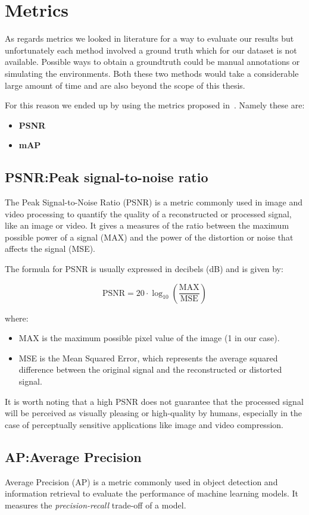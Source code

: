 \section{Metrics}\label{sec:Metrics}
As regards metrics we looked in literature for a way to evaluate
our results but unfortunately each method involved a ground truth
which for our dataset is not available. Possible ways to obtain
a groundtruth could be manual annotations or simulating the environments.
Both these two methods would take a considerable large amount
of time and are also beyond the scope of this thesis.

For this reason we ended up by using the metrics proposed in~\cite{neuraldiff}.
Namely these are:
\begin{itemize}
    \item \textbf{PSNR}
    \item \textbf{mAP}
\end{itemize}
\subsection{PSNR:Peak signal-to-noise ratio}
The Peak Signal-to-Noise Ratio (PSNR) is a metric commonly used in image and
video processing to quantify the quality of a reconstructed or processed signal,
like an image or video. It gives a measures of the ratio between the 
maximum possible power of a signal (MAX) and the power of the distortion or noise 
that affects the signal (MSE).

The formula for PSNR is usually expressed in decibels (dB) and is given by:

\[ \text{PSNR} = 20 \cdot \log_{10}\left(\frac{{\text{MAX}}}{{\text{MSE}}}\right) \]

where:
\begin{itemize}
    \item MAX is the maximum possible pixel value of the image (1 in our case).
    \item MSE is the Mean Squared Error, which represents the average squared 
    difference between the original signal and the reconstructed or distorted signal.
\end{itemize}

It is worth noting that a high PSNR does not guarantee that the processed signal 
will be perceived as visually pleasing or high-quality by humans, especially in the case of perceptually sensitive applications like image and video compression.

\subsection{AP:Average Precision}
Average Precision (AP) is a metric commonly used in object detection and information retrieval
to evaluate the performance of machine learning models. It measures the \textit{precision-recall} trade-off of a model.

